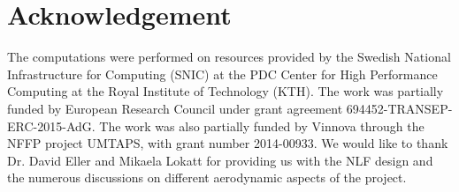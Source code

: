 \section{Acknowledgement} 

The computations were performed on resources provided by the Swedish National Infrastructure for Computing (SNIC) at the PDC Center for High Performance Computing at the Royal Institute of Technology (KTH). The work was partially funded by European Research Council under grant agreement 694452-TRANSEP-ERC-2015-AdG. The work was also partially funded by Vinnova through the NFFP project UMTAPS, with grant number 2014-00933. We would like to thank Dr. David Eller and Mikaela Lokatt for providing us with the NLF design and the numerous discussions on different aerodynamic aspects of the project.



%
%
%
%
%
%
%



%
